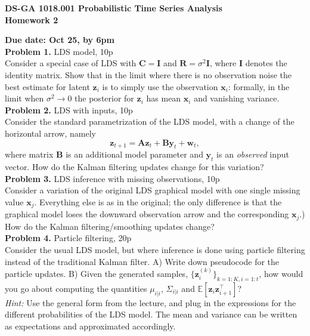 \documentclass[12pt]{article}
\newcommand{\vect}[1]{\mathbf{#1}}
\begin{document}
\thispagestyle{empty}
\begin{center}

\textbf{DS-GA 1018.001 Probabilistic Time Series Analysis\\
Homework 2}
\end{center}

\noindent \textbf{Due date: Oct 25, by 6pm}\\

\noindent \textbf{Problem 1.} LDS model, 10p \\ %
Consider a special case of LDS with $\vect{C} = \vect{I}$ and  $\vect{R} = \sigma^2 \vect{I}$, where $\vect{I}$ denotes the identity matrix. 
Show that in the limit where there is no observation noise the best estimate for latent $\vect{z}_i$ is to simply use the observation $\vect{x}_i$: 
formally, in the limit when $\sigma^2 \rightarrow 0$ the posterior for $\vect{z}_i$ has mean $\vect{x}_i$ and vanishing variance.\\

\noindent \textbf{Problem 2. } LDS with inputs, 10p \\%
Consider the standard parametrization of the LDS model, with a change of the horizontal arrow, namely 
$$\mathbf{z}_{t+1} = \mathbf{A}\mathbf{z}_{t} +  \mathbf{B}\mathbf{y}_{t} +  \mathbf{w}_{t} , $$ 
where matrix  $\mathbf{B}$ is an additional model parameter and $\mathbf{y}_{t}$ is an \emph{observed} input vector.
How do the Kalman filtering updates change for this variation?\\

\noindent \textbf{Problem 3.} LDS inference with missing observations, 10p \\%
Consider a variation of the original LDS graphical model with one single missing value $\mathbf{x}_j$. Everything else is as in the original; the only difference is that the graphical model loses the downward observation arrow and the corresponding $\mathbf{x}_j$.)
How do the Kalman filtering/smoothing updates change?\\

\noindent \textbf{Problem 4.}  Particle filtering, 20p\\%
Consider the usual LDS model, but where inference is done using particle filtering instead of the traditional Kalman filter. A) Write down pseudocode for the particle updates. B) Given the generated samples, $\{\mathbf{z}_i^{(k)}\}_{k=1:K, i=1:t}$, how would you go about computing the quantities $\mu_{i|i}$, $\Sigma_{i|i}$ and $\mathbb{E}[\mathbf{z}_i \mathbf{z}_{i+1}^\top]$?\\
\emph{Hint:} Use the general form from the lecture, and plug in the expressions for the different probabilities of the LDS model. The mean and variance can be written as expectations and approximated accordingly.
\end{document}
